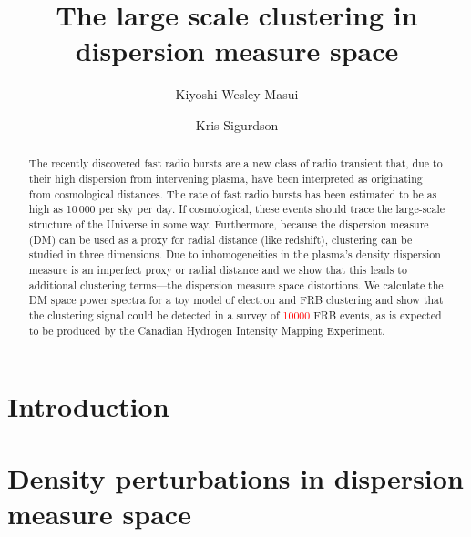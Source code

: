 \documentclass[twocolumn,prl,nofootinbib]{revtex4-1}
\newcommand{\red}{\textcolor{red}}
\begin{document}
\title{The large scale clustering in dispersion measure space}

\author{Kiyoshi Wesley Masui}

\author{Kris Sigurdson}


\begin{abstract}

    The recently discovered fast radio bursts are a new class of radio
    transient that, due to their high dispersion from intervening plasma,
    have been interpreted as
    originating from cosmological distances.  The rate of fast radio bursts
    has been estimated to be as high as 10\,000 per sky per day.  If
    cosmological, these events should trace the large-scale structure of the
    Universe in some way. Furthermore, because the dispersion measure (DM) can be
    used as a proxy for radial distance (like redshift),
    clustering can be studied in three dimensions. Due to inhomogeneities in
    the plasma's density dispersion measure is an imperfect proxy or radial
    distance and we show that this leads to additional clustering terms---the
    dispersion measure space distortions. We calculate the DM space
    power spectra for a toy model of electron and FRB clustering and show that
    the clustering signal could be detected in a survey of \red{10000} FRB
    events, as is expected to be produced by the Canadian Hydrogen Intensity
    Mapping Experiment.

\end{abstract}

\maketitle

\section{Introduction}


\section{Density perturbations in dispersion measure space}
\end{document}
